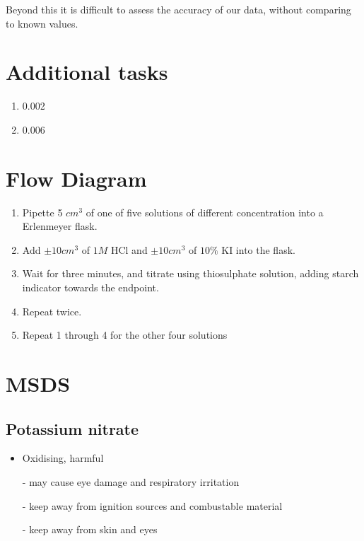 \documentclass[a4paper, british]{article}
\begin{document}
Beyond this it is difficult to assess the accuracy of our data, without comparing to known values.

\newpage

\begin{appendices}

\section{Additional tasks}

\begin{enumerate}
    \item 0.002
    \item 0.006
\end{enumerate}



\section{Flow Diagram}

\begin{enumerate}
    \item Pipette 5 \(cm^3\) of one of five solutions of different concentration into a Erlenmeyer flask.
    \item Add \(\pm 10 cm^3\) of \(1M\) HCl and \(\pm 10 cm^3\) of \(10\%\) KI into the flask.
    \item Wait for three minutes, and titrate using thiosulphate solution, adding starch indicator towards the endpoint.
    \item Repeat twice.
    \item Repeat 1 through 4 for the other four solutions
\end{enumerate}

\section{MSDS}

\subsection*{Potassium nitrate}

\begin{itemize}
    \item Oxidising, harmful
    \item[-] may cause eye damage and respiratory irritation
    \item[-] keep away from ignition sources and combustable material 
    \item[-] keep away from skin and eyes 
\end{itemize}


\end{appendices}
\end{document}
